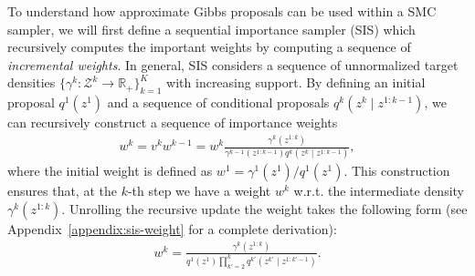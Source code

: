\documentclass{article}
\theoremstyle{definition}
\begin{document}
To understand how approximate Gibbs proposals can be used within a SMC sampler, we will first define a sequential importance sampler (SIS) which recursively computes the important weights by computing a sequence of \emph{incremental weights}. In general, SIS considers a sequence of unnormalized target densities 
$\{\gamma^k: \mathcal{Z}^k \to \mathbb{R}_+\}_{k=1}^K$ with increasing support. 
By defining an initial proposal $q^1(z^1)$ and a sequence of conditional proposals $q^k(z^k \mid z^{1:k-1})$, we can recursively construct a sequence of importance weights 
\begin{align*}
    w^k 
    = v^k w^{k-1}
    = w^k
    \frac{\gamma^k(z^{1:k})}{\gamma^{k-1}(z^{1:k-1}) q^k(z^k \mid z^{1:k-1})},
\end{align*}
where the initial weight is defined as $w^1 = \gamma^1(z^1) / q^1(z^1)$.
This construction ensures that, at the $k$-th step we have a weight $w^k$ w.r.t. the intermediate density $\gamma^k(z^{1:k})$. Unrolling the recursive update the weight takes the following form (see Appendix~\ref{appendix:sis-weight} for a complete derivation):
\begin{align*}
    w^k
    =
    \frac{\gamma^k(z^{1:k})}
         {q^1(z^1) \prod_{k'=2}^k q^{k'}(z^{k'} \mid z^{1:k'-1})}.
\end{align*}
\end{document}
